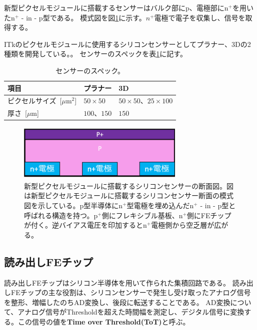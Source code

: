 新型ピクセルモジュールに搭載するセンサーはバルク部にp、電極部にn${}^+$を用いたn${}^+$ - in - p型である。
模式図を図\ref{sensor_image}に示す。$n^+$電極で電子を収集し、信号を取得する。

ITkのピクセルモジュールに使用するシリコンセンサーとしてプラナー、3Dの2種類を開発している。\cite{1-3}。
センサーのスペックを表\ref{sensor_spec}に記す。

\begin{table}[tbp]
\begin{center}
\caption[センサーのスペック]{センサーのスペック。}
\label{sensor_spec}
  \begin{tabular}{|lll|} \hline
    項目 & プラナー & 3D \\\hline
    ピクセルサイズ~[$\mu$m${^2}$] & $50\times 50$ & $50\times 50$、$25\times 100$ \\
    厚さ~[$\mu$m] & $100、150$ & $150$  \\\hline
  \end{tabular}
\end{center}
\end{table}


\begin{figure}[bpt]\centering
\includegraphics[width=8cm]{./sensor_image.png}
\caption[新型ピクセルモジュールに搭載するシリコンセンサーの断面図]{新型ピクセルモジュールに搭載するシリコンセンサーの断面図。図は新型ピクセルモジュールに搭載するシリコンセンサー断面の模式図を示している。p型半導体にn${}^+$型電極を埋め込んだn${}^+$ - in - p型と呼ばれる構造を持つ。p${}^+$側にフレキシブル基板、n${}^+$側にFEチップが付く。逆バイアス電圧を印加するとn${}^+$電極側から空乏層が広がる。}
\label{sensor_image}
\end{figure}

\subsection{読み出しFEチップ}
読み出しFEチップはシリコン半導体を用いて作られた集積回路である。
読み出しFEチップの主な役割は、シリコンセンサーで発生し受け取ったアナログ信号を整形、増幅したのちAD変換し、後段に転送することである。
AD変換について、アナログ信号がThresholdを超えた時間幅を測定し、デジタル信号に変換する。この信号の値を\textbf{Time over Threshold(ToT)}と呼ぶ。

